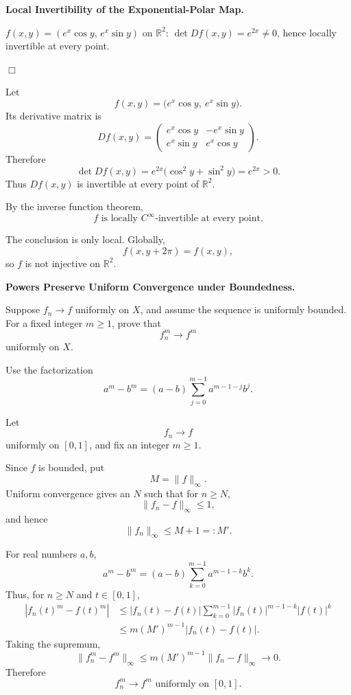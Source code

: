 \begin{problem}[CP-II-0050]
\label{prob:cp-ii-0050}
\textbf{Local Invertibility of the Exponential-Polar Map.}

\hspace*{1.5em}$f(x,y)=(e^x\cos y,\,e^x\sin y)$ on $\mathbb{R}^2$:
	$\det Df(x,y)=e^{2x}\ne0$, hence locally invertible at every point.

\hfill$\Box$
\end{problem}

\begin{solution}
Let
\[
f(x,y)
=
\bigl(e^x\cos y,\ e^x\sin y\bigr).
\]
Its derivative matrix is
\[
Df(x,y)
=
\begin{pmatrix}
e^x\cos y&-e^x\sin y\\
e^x\sin y&e^x\cos y
\end{pmatrix}.
\]
Therefore
\[
\det Df(x,y)
=
e^{2x}\bigl(\cos^2y+\sin^2y\bigr)
=
e^{2x}>0.
\]
Thus \(Df(x,y)\) is invertible at every point of \(\mathbb R^2\).

By the inverse function theorem,
\[
\boxed{
f\text{ is locally }C^\infty\text{-invertible at every point}.
}
\]

The conclusion is only local. Globally,
\[
f(x,y+2\pi)=f(x,y),
\]
so \(f\) is not injective on \(\mathbb R^2\).
\end{solution}


\begin{problem}[CP-II-0051]
\label{prob:cp-ii-0051}
\textbf{Powers Preserve Uniform Convergence under Boundedness.}

\hspace*{1.5em}Suppose \(f_n\to f\) uniformly on \(X\), and assume the sequence is uniformly
bounded. For a fixed integer \(m\ge1\), prove that
\[
f_n^m\to f^m
\]
uniformly on \(X\).

Use the factorization
\[
a^m-b^m=(a-b)\sum_{j=0}^{m-1}a^{m-1-j}b^j.
\]
\end{problem}

\begin{solution}
Let
\[
f_n\to f
\]
uniformly on \([0,1]\), and fix an integer \(m\ge1\).

Since \(f\) is bounded, put
\[
M=\|f\|_\infty.
\]
Uniform convergence gives an \(N\) such that for \(n\ge N\),
\[
\|f_n-f\|_\infty\le1,
\]
and hence
\[
\|f_n\|_\infty\le M+1=:M'.
\]

For real numbers \(a,b\),
\[
a^m-b^m
=
(a-b)\sum_{k=0}^{m-1}a^{m-1-k}b^k.
\]
Thus, for \(n\ge N\) and \(t\in[0,1]\),
\[
\begin{aligned}
|f_n(t)^m-f(t)^m|
&\le
|f_n(t)-f(t)|
\sum_{k=0}^{m-1}
|f_n(t)|^{m-1-k}|f(t)|^k\\
&\le
m(M')^{m-1}|f_n(t)-f(t)|.
\end{aligned}
\]
Taking the supremum,
\[
\|f_n^m-f^m\|_\infty
\le
m(M')^{m-1}\|f_n-f\|_\infty
\longrightarrow0.
\]
Therefore
\[
\boxed{
f_n^m\to f^m
\text{ uniformly on }[0,1].
}
\]
\end{solution}


